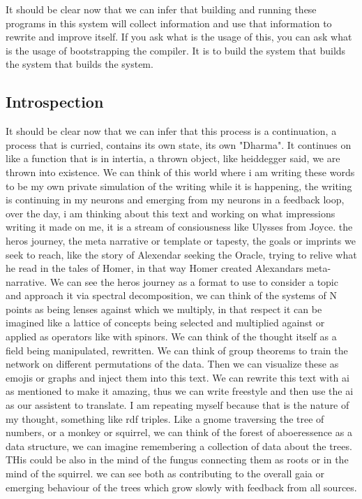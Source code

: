 \documentclass{article}
\begin{document}
It should be clear now that we can infer
that building and running these programs in this system will collect information
and use that information to rewrite and improve itself. If you ask what is the usage of this, you can ask what is the usage of bootstrapping the compiler. It  is to build the system that builds the system that builds the system.

\subsection{Introspection}

It should be clear now that we can infer
that this process is a continuation, a process that is curried,
contains its own state, its own "Dharma".
It continues on like a function that is in intertia, a thrown object, like heiddegger said, we are thrown into existence.
We can think of this world where i am writing these words to be my own private
simulation of the writing while it is happening, the writing is continuing
in my neurons and emerging from my neurons in a feedback loop,
over the day, i am thinking about this text and working on what impressions
writing it made on me, it is a stream of consiousness like Ulysses from Joyce.
the heros journey, the meta narrative or template or tapesty, the goals or imprints we seek to reach, like the story of Alexendar seeking the Oracle, trying to relive what he read in the tales of Homer, in that way Homer created Alexandars meta-narrative. We can see the heros journey as a format to use to consider a topic and approach it via spectral decomposition, we can think of the systems of N points as being lenses against which we multiply, in that respect it can be imagined like a lattice of concepts being selected and multiplied against or applied as operators like with spinors. We can think of the thought itself as a field being manipulated, rewritten. We can think of group theorems to train the network on different permutations of the data. Then we can visualize these as emojis or graphs and inject them into this text. We can rewrite this text with ai as mentioned to make it amazing, thus we can write freestyle and then use the ai as our assistent to translate. I am repeating myself because that is the nature of my thought, something like rdf triples. Like a gnome traversing the tree of numbers, or a monkey or squirrel,
we can think of the forest of aboeressence as a data structure, we can imagine remembering a collection of data about the trees. THis could be also in the mind of the fungus connecting them as roots or in the mind of the squirrel. we can see both as contributing to the overall gaia or emerging behaviour of the trees which grow slowly with feedback from all sources.
\end{document}
